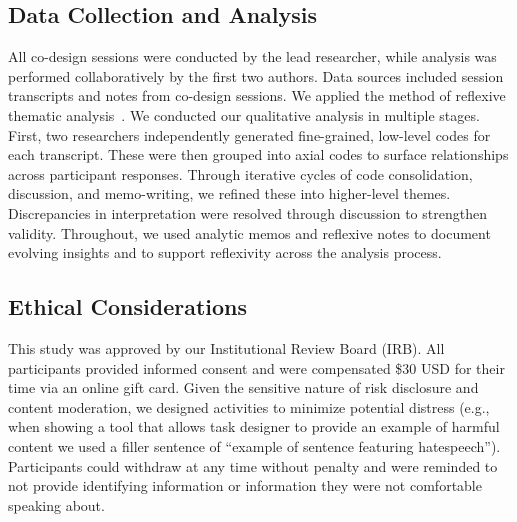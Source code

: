 \subsection{Data Collection and Analysis}
All co-design sessions were conducted by the lead researcher, while analysis was performed collaboratively by the first two authors. Data sources included session transcripts and notes from co-design sessions. We applied the method of reflexive thematic analysis~\cite{clarke2017thematic, smith1995semi}. We conducted our qualitative analysis in multiple stages. First, two researchers independently generated fine-grained, low-level codes for each transcript. These were then grouped into axial codes to surface relationships across participant responses. Through iterative cycles of code consolidation, discussion, and memo-writing, we refined these into higher-level themes. Discrepancies in interpretation were resolved through discussion to strengthen validity. Throughout, we used analytic memos and reflexive notes to document evolving insights and to support reflexivity across the analysis process.


\subsection{Ethical Considerations}
This study was approved by our Institutional Review Board (IRB). All participants provided informed consent and were compensated \$30 USD for their time via an online gift card. Given the sensitive nature of risk disclosure and content moderation, we designed activities to minimize potential distress (e.g., when showing a tool that allows task designer to provide an example of harmful content we used a filler sentence of ``example of sentence featuring hatespeech''). Participants could withdraw at any time without penalty and were reminded to not provide identifying information or information they were not comfortable speaking about. 